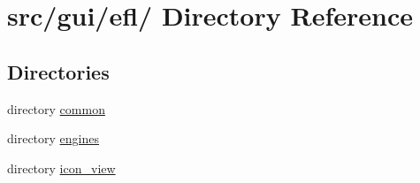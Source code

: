 \hypertarget{dir_000012}{
\section{src/gui/efl/ Directory Reference}
\label{dir_000012}
}
\subsection*{Directories}
\begin{CompactItemize}
\item 
directory \hyperlink{dir_000020}{common}
\item 
directory \hyperlink{dir_000013}{engines}
\item 
directory \hyperlink{dir_000019}{icon\_\-view}
\end{CompactItemize}
